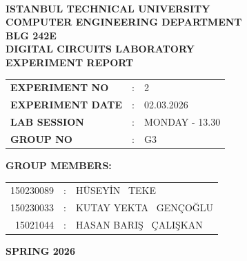 \documentclass[12pt,a4paper]{article}
\begin{document}
\nocite{*}
\begin{titlepage}
\begin{center}

\textbf{}\\
\textbf{\Large{ISTANBUL TECHNICAL UNIVERSITY}}\\
\vspace{0.5cm}
\textbf{\Large{COMPUTER ENGINEERING DEPARTMENT}}\\
\vspace{2cm}
\textbf{\Large{BLG 242E\\ DIGITAL CIRCUITS LABORATORY\\ EXPERIMENT REPORT}}\\
\vspace{2.8cm}
\begin{table}[ht]
\centering
\Large{
\begin{tabular}{lcl}
\textbf{EXPERIMENT NO}  & : & 2 \\
\textbf{EXPERIMENT DATE}  & : & 02.03.2026 \\
\textbf{LAB SESSION}  & : & MONDAY - 13.30 \\
\textbf{GROUP NO}  & : & G3 \\
\end{tabular}}
\end{table}
\vspace{1cm}
\textbf{\Large{GROUP MEMBERS:}}\\
\begin{table}[ht]
\centering
\Large{
\begin{tabular}{rcl}
150230089  & : & HÜSEYİN \ TEKE \\
150230033  & : & KUTAY YEKTA \ GENÇOĞLU \\
15021044  & : & HASAN BARIŞ \ ÇALIŞKAN \\

\end{tabular}}
\end{table}
\vspace{2.8cm}
\textbf{\Large{SPRING 2026}}

\end{center}

\end{titlepage}

\thispagestyle{empty}
\setcounter{tocdepth}{4}
\tableofcontents
\clearpage

\setcounter{page}{1}
\end{document}

